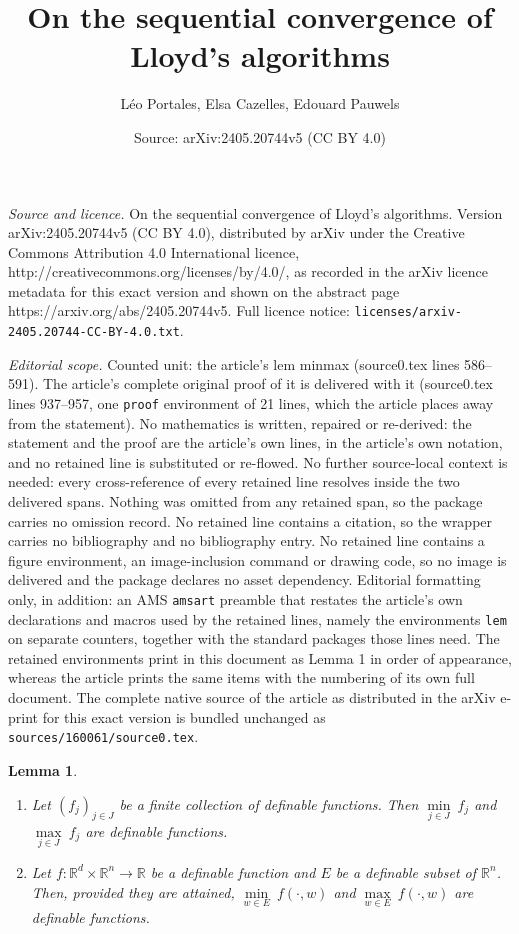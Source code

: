 \documentclass[10pt,a4paper]{amsart}
\title{On the sequential convergence of Lloyd's algorithms}
\author{L\'eo Portales, Elsa Cazelles, Edouard Pauwels}
\date{Source: arXiv:2405.20744v5 (CC BY 4.0)}
\newtheorem{lem}{Lemma}
\begin{document}
\maketitle

\noindent\emph{Source and licence.} On the sequential convergence of Lloyd's algorithms. Version arXiv:2405.20744v5 (CC BY 4.0), distributed by arXiv under the Creative Commons Attribution 4.0 International licence, http://creativecommons.org/licenses/by/4.0/, as recorded in the arXiv licence metadata for this exact version and shown on the abstract page https://arxiv.org/abs/2405.20744v5. Full licence notice: \texttt{licenses/arxiv-2405.20744-CC-BY-4.0.txt}.\par\smallskip

\noindent\textit{Editorial scope.} Counted unit: the article's lem minmax (source0.tex lines 586--591). The article's complete original proof of it is delivered with it (source0.tex lines 937--957, one \texttt{proof} environment of 21 lines, which the article places away from the statement). No mathematics is written, repaired or re-derived: the statement and the proof are the article's own lines, in the article's own notation, and no retained line is substituted or re-flowed.  No further source-local context is needed: every cross-reference of every retained line resolves inside the two delivered spans.  Nothing was omitted from any retained span, so the package carries no omission record.  No retained line contains a citation, so the wrapper carries no bibliography and no bibliography entry.  No retained line contains a figure environment, an image-inclusion command or drawing code, so no image is delivered and the package declares no asset dependency.  Editorial formatting only, in addition: an AMS \texttt{amsart} preamble that restates the article's own declarations and macros used by the retained lines, namely the environments \texttt{lem} on separate counters, together with the standard packages those lines need.  The retained environments print in this document as Lemma 1 in order of appearance, whereas the article prints the same items with the numbering of its own full document.  The complete native source of the article as distributed in the arXiv e-print for this exact version is bundled unchanged as \texttt{sources/160061/source0.tex}.
\begin{lem}\label{minmax} \hfill
\begin{enumerate}
    \item[(i)] Let $(f_{j})_{j\in J}$ be a finite collection of definable functions. Then $\underset{j\in J}{\min}\: f_{j}$ and $\underset{j\in J}{\max}\: f_{j}$ are definable functions. 
    \item[(ii)] Let $f:\mathbb{R}^{d}\times \mathbb{R}^{n}\longrightarrow \mathbb{R}$ be a definable function and $E$ be a definable subset of $\mathbb{R}^{n}$. Then, provided they are attained, $\underset{w\in E}{\min}\: f(\cdot,w)$ and $\underset{w\in E}{\max}\: f(\cdot,w)$ are definable functions.
\end{enumerate}
\end{lem}
\end{document}
